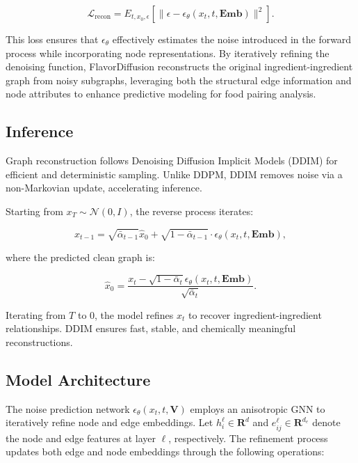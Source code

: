 \begin{equation*}
    \mathcal{L}_{\text{recon}} = E_{t, x_0, \epsilon} \left[ \| \epsilon - \epsilon_{\theta}(x_t, t, \mathbf{Emb}) \|^2 \right].
\end{equation*}

This loss ensures that \( \epsilon_{\theta} \) effectively estimates the noise introduced in the forward process while incorporating node representations. By iteratively refining the denoising function, FlavorDiffusion reconstructs the original ingredient-ingredient graph from noisy subgraphs, leveraging both the structural edge information and node attributes to enhance predictive modeling for food pairing analysis.

\subsection{Inference}

Graph reconstruction follows Denoising Diffusion Implicit Models (DDIM) for efficient and deterministic sampling. Unlike DDPM, DDIM removes noise via a non-Markovian update, accelerating inference.

Starting from \( x_T \sim \mathcal{N}(0, I) \), the reverse process iterates:

\begin{equation*}
    x_{t-1} = \sqrt{\bar{\alpha}_{t-1}} \hat{x}_0 + \sqrt{1 - \bar{\alpha}_{t-1}} \cdot \epsilon_{\theta}(x_t, t, \mathbf{Emb}),
\end{equation*}

where the predicted clean graph is:

\begin{equation*}
    \hat{x}_0 = \frac{x_t - \sqrt{1 - \bar{\alpha}_t} \epsilon_{\theta}(x_t, t, \mathbf{Emb})}{\sqrt{\bar{\alpha}_t}}.
\end{equation*}

Iterating from \( T \) to \( 0 \), the model refines \( x_t \) to recover ingredient-ingredient relationships. DDIM ensures fast, stable, and chemically meaningful reconstructions.

\subsection{Model Architecture}

The noise prediction network \( \epsilon_{\theta}(x_t, t, \mathbf{V}) \) employs an anisotropic GNN to iteratively refine node and edge embeddings. Let \( h_i^\ell \in \mathbf{R}^d \) and \( e_{ij}^\ell \in \mathbf{R}^{d_e} \) denote the node and edge features at layer \( \ell \), respectively. The refinement process updates both edge and node embeddings through the following operations:

